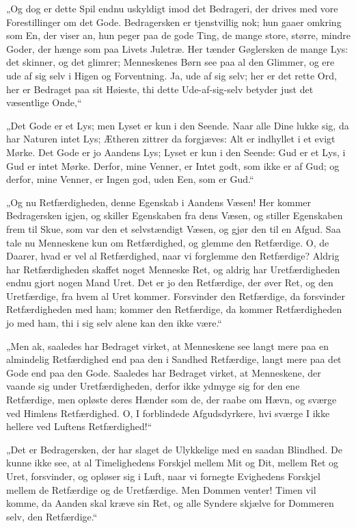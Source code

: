 \documentclass[12pt,a4paper]{book}
\newcommand{\apage}[1]{\marginnote{\footnotesize\textit{[#1]}}}
\begin{document}
„Og dog er dette Spil endnu uskyldigt imod det Bedrageri, der drives
med vore Forestillinger om det Gode. Bedragersken er tjenstvillig nok;
hun gaaer omkring som En, der viser an, hun peger paa de gode Ting, de
mange store, større, mindre Goder, der hænge som paa Livets Juletræ. Her
tænder Gøglersken de mange Lys: det skinner, og det glimrer;
Menneskenes Børn see paa al den Glimmer, og ere ude af sig selv i Higen
og Forventning. Ja, ude af sig selv; her er det rette Ord, her er
Bedraget paa sit Høieste, thi dette Ude-af-sig-selv betyder just det
væsentlige Onde,“

„Det Gode er et Lys; men Lyset er kun i den Seende. Naar alle Dine
lukke sig, da har Naturen intet Lys; Ætheren zittrer da forgjæves: Alt
er indhyllet i et evigt Mørke. Det Gode er jo Aandens Lys; Lyset er kun
i den Seende: Gud er et Lys, i Gud er intet Mørke. Derfor, mine Venner,
er \apage{36} Intet godt, som ikke er af Gud; og derfor, mine Venner, er Ingen god,
uden Een, som er Gud.“

„Og nu Retfærdigheden, denne Egenskab i Aandens Væsen! Her kommer
Bedragersken igjen, og skiller Egenskaben fra dens Væsen, og stiller
Egenskaben frem til Skue, som var den et selvstændigt Væsen, og gjør den
til en Afgud. Saa tale nu Menneskene kun om Retfærdighed, og glemme den
Retfærdige. O, de Daarer, hvad er vel al Retfærdighed, naar vi forglemme
den Retfærdige? Aldrig har Retfærdigheden skaffet noget Menneske Ret, og
aldrig har Uretfærdigheden endnu gjort nogen Mand Uret. Det er jo den
Retfærdige, der øver Ret, og den Uretfærdige, fra hvem al Uret kommer.
Forsvinder den Retfærdige, da forsvinder Retfærdigheden med ham; kommer
den Retfærdige, da kommer Retfærdigheden jo med ham, thi i sig selv
alene kan den ikke være.“

„Men ak, saaledes har Bedraget virket, at Menneskene see langt mere paa
en almindelig Retfærdighed end paa den i Sandhed Retfærdige, langt mere
paa det Gode end paa den Gode. Saaledes har Bedraget virket, at
Menneskene, der vaande sig under Uretfærdigheden, derfor ikke ydmyge sig
for den ene Retfærdige, men opløste deres Hænder som de, der raabe om
Hævn, og sværge ved Himlens Retfærdighed. O, I forblindede
Afgudsdyrkere, hvi sværge I ikke hellere ved Luftens Retfærdighed!“

„Det er Bedragersken, der har slaget de Ulykkelige med en saadan
Blindhed. De kunne ikke see, at al Timelighedens Forskjel mellem Mit og
Dit, mellem Ret og Uret, forsvinder, og opløser sig i Luft, naar vi
fornegte Evighedens Forskjel mellem de Retfærdige og de Uretfærdige. Men
Dommen venter! Timen vil komme, da Aanden skal kræve sin Ret, og alle
Syndere skjælve for Dommeren selv, den Retfærdige.“
\end{document}

